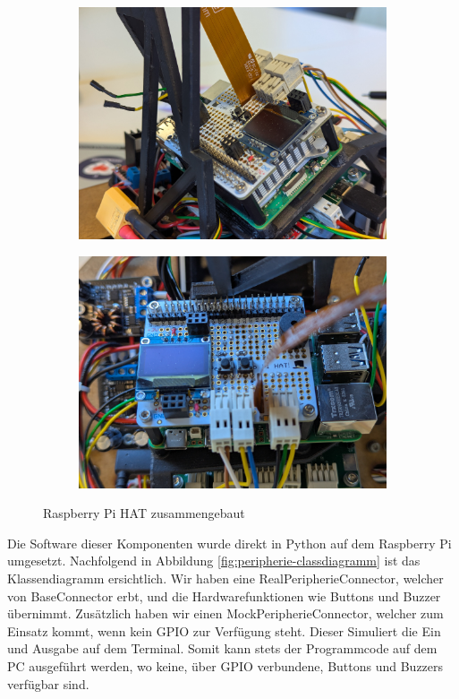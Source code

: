 \begin{figure}[H]
    \centering
    \begin{subfigure}[t]{0.49\textwidth}
        \includegraphics[width=\linewidth]{assets/IT/peripherie/raspi-hat_1.jpg}
    \end{subfigure}
    \hfill
    \begin{subfigure}[t]{0.49\textwidth}
        \includegraphics[width=\linewidth]{assets/IT/peripherie/raspi-hat_2.jpg}
    \end{subfigure}
    \caption{Raspberry Pi HAT zusammengebaut}
    \label{fig:raspiheader-assembly}
\end{figure}

Die Software dieser Komponenten wurde direkt in Python auf dem Raspberry Pi umgesetzt. Nachfolgend in Abbildung \ref{fig:peripherie-classdiagramm} ist das Klassendiagramm ersichtlich. Wir haben eine RealPeripherieConnector, welcher von BaseConnector erbt, und die Hardwarefunktionen wie Buttons und Buzzer übernimmt. Zusätzlich haben wir einen MockPeripherieConnector, welcher zum Einsatz kommt, wenn kein GPIO zur Verfügung steht. Dieser Simuliert die Ein und Ausgabe auf dem Terminal. Somit kann stets der Programmcode auf dem PC ausgeführt werden, wo keine, über GPIO verbundene, Buttons und Buzzers verfügbar sind.

